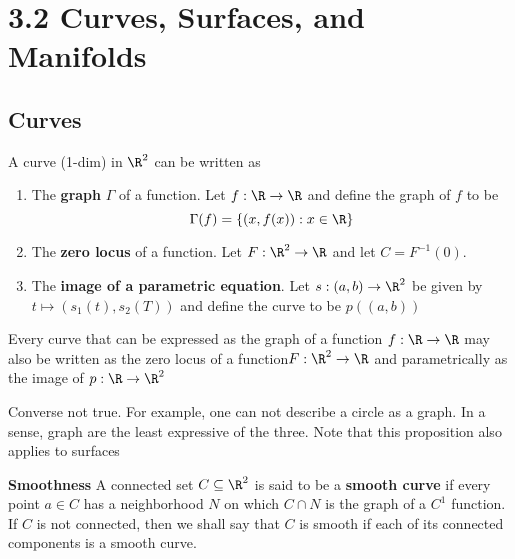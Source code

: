 \documentclass[11pt]{article}
\begin{document}
\section*{3.2 Curves, Surfaces, and Manifolds}

\subsection*{Curves}

\begin{defn*}
  A curve (1-dim) in $\R^2$ can be written as
  \begin{enumerate}
    \item The \textbf{graph} $\Gamma$ of a function. Let $f: \R \to \R$ and define the graph of $f$ to be
    \[
      \Gamma(f) = \{ (x, f(x)): x\in\R \}
    \]
    \item The \textbf{zero locus} of a function. Let $F:\R^2 \to \R$ and let $C = F^{-1}(0)$.
    \item The \textbf{image of a parametric equation}. Let $s: (a,b) \to \R^2$ be given by $t\mapsto (s_1(t), s_2(T))$ and define the curve to be $p((a,b))$
  \end{enumerate}
\end{defn*}

\begin{proposition*}
  Every curve that can be expressed as the graph of a function $f:\R\to\R$ may also be written as the zero locus of a function$F:\R^2 \to \R$ and parametrically as the image of $p:\R \to \R^2$
  \begin{rem}
    Converse not true. For example, one can not describe a circle as a graph. In a sense, graph are the least expressive of the three. Note that this proposition also applies to surfaces
  \end{rem}
\end{proposition*}


\begin{defn*}
  \textbf{Smoothness} A connected set $C\subseteq \R^2$ is said to be a \textbf{smooth curve} if every point $a\in C$ has a neighborhood $N$ on which $C\cap N$ is the graph of a $C^1$ function. If $C$ is not connected, then we shall say that $C$ is smooth if each of its connected components is a smooth curve.
\end{defn*}
\end{document}
